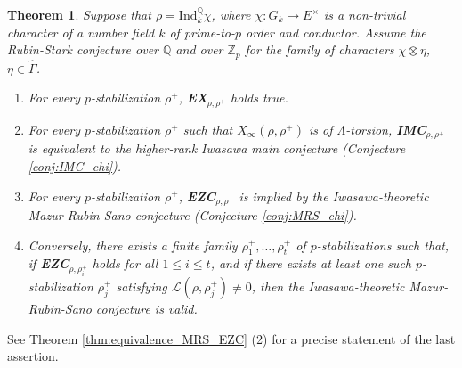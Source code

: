 \documentclass[12pt]{amsart}
\newcommand\bQ{\mathbb{Q}}
\newcommand\Zp{{\mathbb{Z}_p}}
\newcommand\cL{\mathcal{L}}
\newcommand{\Ind}{\mathrm{Ind}}
\theoremstyle{defstyle}
\theoremstyle{thmstyle}
\newtheorem{THM}{Theorem}
\begin{document}
\begin{THM}\label{thm:intro_C}
	Suppose that $\rho=\Ind_k^\bQ\chi$, where $\chi:G_k\longrightarrow E^\times$ is a non-trivial character of a number field $k$ of prime-to-$p$ order and conductor. Assume the Rubin-Stark conjecture over ${\bQ}$ and over $\Zp$ for the family of characters $\chi \otimes \eta$, ${\eta\in \widehat{\Gamma}}$.
	\begin{enumerate}
		\item For every $p$-stabilization $\rho^+$, \textbf{EX}$_{\rho,\rho^+}$ holds true.
		\item For every $p$-stabilization $\rho^+$ such that $X_\infty(\rho,\rho^+)$ is of $\Lambda$-torsion, \textbf{IMC}$_{\rho,\rho^+}$ is equivalent to the higher-rank Iwasawa main conjecture (Conjecture \ref{conj:IMC_chi}).
		\item For every $p$-stabilization $\rho^+$, \textbf{EZC}$_{\rho,\rho^+}$ is implied by the Iwasawa-theoretic Mazur-Rubin-Sano conjecture (Conjecture \ref{conj:MRS_chi}).
		\item Conversely, there exists a finite family $\rho^+_1,\ldots,\rho^+_t$ of $p$-stabilizations such that, if \textbf{EZC}$_{\rho,\rho_i^+}$ holds for all $1\leq i\leq t$, and if there exists at least one such $p$-stabilization $\rho_j^+$ satisfying $\cL(\rho,\rho_j^+)\neq 0$, then the Iwasawa-theoretic Mazur-Rubin-Sano conjecture is valid.
	\end{enumerate}
\end{THM}
See Theorem \ref{thm:equivalence_MRS_EZC} (2) for a precise statement of the last assertion. 
\end{document}
